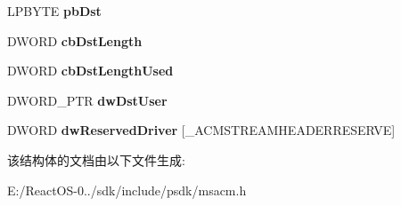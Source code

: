 \begin{DoxyCompactItemize}
L\+P\+B\+Y\+TE {\bfseries pb\+Dst}
\item 
\mbox{\label{struct___a_c_m_s_t_r_e_a_m_h_e_a_d_e_r_aa7c14fe78109b73ea6e8c2a865ab4c49}} 
D\+W\+O\+RD {\bfseries cb\+Dst\+Length}
\item 
\mbox{\label{struct___a_c_m_s_t_r_e_a_m_h_e_a_d_e_r_ae2b7eec14c594e927c34b2fbff76bf02}} 
D\+W\+O\+RD {\bfseries cb\+Dst\+Length\+Used}
\item 
\mbox{\label{struct___a_c_m_s_t_r_e_a_m_h_e_a_d_e_r_ae2392fc5e69ffe46c3dbfdde81982d9f}} 
D\+W\+O\+R\+D\+\_\+\+P\+TR {\bfseries dw\+Dst\+User}
\item 
\mbox{\label{struct___a_c_m_s_t_r_e_a_m_h_e_a_d_e_r_ad4ac8e6345b2c502f8ff01ec6d703541}} 
D\+W\+O\+RD {\bfseries dw\+Reserved\+Driver} \mbox{[}\+\_\+\+A\+C\+M\+S\+T\+R\+E\+A\+M\+H\+E\+A\+D\+E\+R\+R\+E\+S\+E\+R\+VE\mbox{]}
\end{DoxyCompactItemize}


该结构体的文档由以下文件生成\+:\begin{DoxyCompactItemize}
\item 
E\+:/\+React\+O\+S-\/0../sdk/include/psdk/msacm.\+h\end{DoxyCompactItemize}
